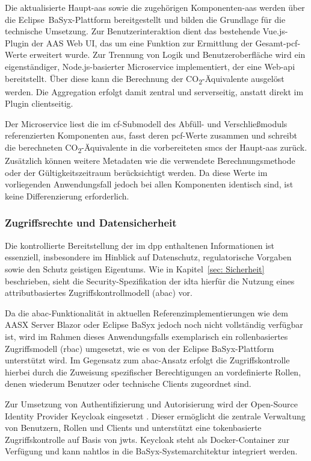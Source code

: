 Die aktualisierte Haupt-\acs{aas} sowie die zugehörigen Komponenten-\acs{aas} werden über die Eclipse~BaSyx-Plattform bereitgestellt und bilden die Grundlage für die technische Umsetzung.
Zur Benutzerinteraktion dient das bestehende Vue.js-Plugin der AAS Web UI, das um eine Funktion zur Ermittlung der Gesamt-\acs{pcf}-Werte erweitert wurde.
Zur Trennung von Logik und Benutzeroberfläche wird ein eigenständiger, Node.js-basierter Microservice implementiert, der eine Web-\acs{api} bereitstellt.
Über diese kann die Berechnung der CO\textsubscript{2}-Äquivalente ausgelöst werden.
Die Aggregation erfolgt damit zentral und serverseitig, anstatt direkt im Plugin clientseitig.

Der Microservice liest die im \acs{cf}-Submodell des Abfüll- und Verschließmoduls referenzierten Komponenten aus, fasst deren \acs{pcf}-Werte zusammen und schreibt die berechneten CO\textsubscript{2}-Äquivalente in die vorbereiteten \acsp{smc} der Haupt-\acs{aas} zurück.
Zusätzlich können weitere Metadaten wie die verwendete Berechnungsmethode oder der Gültigkeitszeitraum berücksichtigt werden.
Da diese Werte im vorliegenden Anwendungsfall jedoch bei allen Komponenten identisch sind, ist keine Differenzierung erforderlich.

\subsubsection{Zugriffsrechte und Datensicherheit}

Die kontrollierte Bereitstellung der im \acs{dpp} enthaltenen Informationen ist essenziell, insbesondere im Hinblick auf Datenschutz, regulatorische Vorgaben sowie den Schutz geistigen Eigentums.  
Wie in Kapitel~\ref{sec: Sicherheit} beschrieben, sieht die Security-Spezifikation der \acs{idta} hierfür die Nutzung eines attributbasiertes Zugriffskontrollmodell (\acs{abac}) vor.

Da die \acs{abac}-Funktionalität in aktuellen Referenzimplementierungen wie dem AASX Server Blazor oder Eclipse BaSyx jedoch noch nicht vollständig verfügbar ist, wird im Rahmen dieses Anwendungsfalls exemplarisch ein rollenbasiertes Zugriffsmodell (\acs{rbac}) umgesetzt, wie es von der Eclipse BaSyx-Plattform unterstützt wird.  
Im Gegensatz zum \acs{abac}-Ansatz erfolgt die Zugriffskontrolle hierbei durch die Zuweisung spezifischer Berechtigungen an vordefinierte Rollen, denen wiederum Benutzer oder technische Clients zugeordnet sind.

Zur Umsetzung von Authentifizierung und Autorisierung wird der Open-Source Identity Provider Keycloak eingesetzt \cite{Keycloak}.  
Dieser ermöglicht die zentrale Verwaltung von Benutzern, Rollen und Clients und unterstützt eine tokenbasierte Zugriffskontrolle auf Basis von \acsp{jwt}.  
Keycloak steht als Docker-Container zur Verfügung und kann nahtlos in die BaSyx-Systemarchitektur integriert werden.

